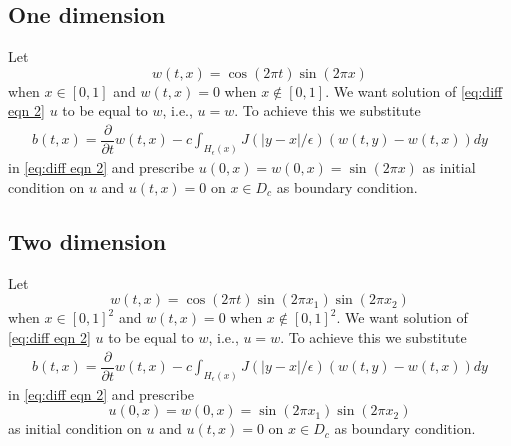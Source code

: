 \documentclass[11pt,twocolumn]{amsart}
\theoremstyle{definition}
\theoremstyle{definition}
\numberwithin{equation}{section}
\numberwithin{equation}{section}
\begin{document}
\subsection{One dimension}
Let $$w(t,x) = \cos(2\pi t) \sin(2\pi x)$$ when $x\in [0,1]$ and $w(t,x) = 0$ when $x\notin [0,1]$. We want solution of \autoref{eq:diff eqn 2} $u$ to be equal to $w$, i.e., $u = w$. To achieve this we substitute 
\begin{align}\label{eq:source exact}
b(t,x) = \dfrac{\partial }{\partial t} w(t,x) -  c \int_{H_\epsilon(x)} J(|y-x|/\epsilon) (w(t,y) - w(t,x)) dy 
\end{align}
in \autoref{eq:diff eqn 2} and prescribe $u(0,x) = w(0,x) = \sin(2\pi x)$ as initial condition on $u$ and $u(t,x) = 0$ on $x\in D_c$ as boundary condition. 

\subsection{Two dimension}
Let $$w(t,x) = \cos(2\pi t) \sin(2\pi x_1)  \sin(2\pi x_2)$$ when $x\in [0,1]^2$ and $w(t,x) = 0$ when $x\notin [0,1]^2$. We want solution of \autoref{eq:diff eqn 2} $u$ to be equal to $w$, i.e., $u = w$. To achieve this we substitute 
\begin{align}\label{eq:source exact}
b(t,x) = \dfrac{\partial }{\partial t} w(t,x) -  c \int_{H_\epsilon(x)} J(|y-x|/\epsilon) (w(t,y) - w(t,x)) dy 
\end{align}
in \autoref{eq:diff eqn 2} and prescribe $$u(0,x) = w(0,x) = \sin(2\pi x_1)\sin(2\pi x_2)$$ as initial condition on $u$ and $u(t,x) = 0$ on $x\in D_c$ as boundary condition. 

\FloatBarrier
%
%
\end{document}
